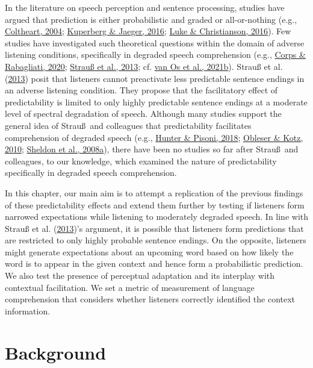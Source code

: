 \documentclass[a4paper, nobind]{templates/ociamthesis}
\begin{document}
In the literature on speech perception and sentence processing, studies have argued that prediction is either probabilistic and graded or all-or-nothing (e.g., \protect\hyperlink{ref-Coltheart2004}{Coltheart, 2004}; \protect\hyperlink{ref-Kuperberg2016}{Kuperberg \& Jaeger, 2016}; \protect\hyperlink{ref-Luke2016}{Luke \& Christianson, 2016}).
Few studies have investigated such theoretical questions within the domain of adverse listening conditions, specifically in degraded speech comprehension (e.g., \protect\hyperlink{ref-Corps2020}{Corps \& Rabagliati, 2020}; \protect\hyperlink{ref-Strauss2013}{Strauß et al., 2013}; cf. \protect\hyperlink{ref-vanOs2021}{van Os et al., 2021b}).
Strauß et al. (\protect\hyperlink{ref-Strauss2013}{2013}) posit that listeners cannot preactivate less predictable sentence endings in an adverse listening condition.
They propose that the facilitatory effect of predictability is limited to only highly predictable sentence endings at a moderate level of spectral degradation of speech.
Although many studies support the general idea of Strau\ss~and colleagues that predictability facilitates comprehension of degraded speech (e.g., \protect\hyperlink{ref-Hunter2018}{Hunter \& Pisoni, 2018}; \protect\hyperlink{ref-Obleser2010}{Obleser \& Kotz, 2010}; \protect\hyperlink{ref-Sheldon2008a}{Sheldon et al., 2008a}),
there have been no studies so far after Strau\ss~and colleagues, to our knowledge, which examined the nature of predictability specifically in degraded speech comprehension.

In this chapter, our main aim is to attempt a replication of the previous findings of these predictability effects
and extend them further by testing if listeners form narrowed expectations while listening to moderately degraded speech.
In line with Strauß et al. (\protect\hyperlink{ref-Strauss2013}{2013})'s argument, it is possible that listeners form predictions that are restricted to only highly probable sentence endings.
On the opposite, listeners might generate expectations about an upcoming word based on how likely the word is to appear in the given context
and hence form a probabilistic prediction.
We also test the presence of perceptual adaptation and its interplay with contextual facilitation.
We set a metric of measurement of language comprehension that considers whether listeners correctly identified the context information.

\hypertarget{background-1}{%
\section{Background}\label{background-1}}
\end{document}

